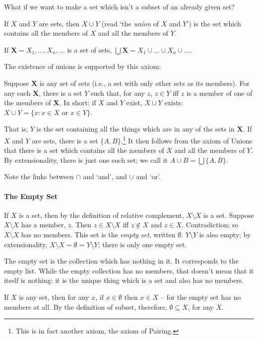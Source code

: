 What if we want to make a set which isn't a subset of an already given set?
\begin{definition}[Union] If $X$ and $Y$ are sets, then $X \cup Y$
    (read `the \emph{union} of $X$ and $Y$') is the set which contains all the members of $X$ and all the members of $Y$. 

If $\mathbf{X}=X_{1},\ldots,X_{n},\ldots$ is a set of sets, $\bigcup \mathbf{X} = X_{1} \cup \ldots \cup X_{n} \cup \ldots$.
\end{definition}
The existence of unions is supported by this axiom: \begin{axiom}[Unions]
  Suppose $\mathbf{X}$ is any set of sets (i.e., a set with only other sets as its members). For any such $\mathbf{X}$, there is a set $Y$ such that, for any $z$, $z\in Y$ iff $z$ is a member of one of the members of $\mathbf{X}$.  In short: if $X$ and $Y$ exist, $X\cup Y$ exists: $X \cup Y = \{x:x\in X \text{ or } x \in Y\}$.  
\end{axiom} That is, $Y$ is the set containing all the things which are in any of the sets in $\mathbf{X}$. If $X$ and $Y$ are sets, there is a set $\{A,B\}$.\footnote{This is in fact another axiom, the axiom of Pairing.} It then follows from the axiom of Unions that there is a set which contains all the members of $X$ and all the members of $Y$. By extensionality, there is just one such set; we call it $A \cup B = \bigcup\{A,B\}$.

Note the links  between $\cap$ and `and', and $\cup$ and `or'.

\paragraph{The Empty Set}

If $X$ is a set, then by the definition of relative complement, $X\setminus X$ is a set. Suppose $X\setminus X$ has a member, $z$.  Then 	$z\in X\setminus X$ iff $z \notin X \text{ and } z \in X$. Contradiction; so $X\setminus X$ has no members. This set is the \emph{empty set}, written $\emptyset$. $Y\setminus Y$ is also empty; by extensionality, $X\setminus X=\emptyset=Y\setminus Y$; there is only one empty set.

The empty set is the collection which has nothing in it. It corresponds to the empty list. While the empty collection has no members, that doesn't mean that it itself is nothing: it is the unique thing which is a set and also has no members. 

 If $X$ is any set, then for any $x$, if $x \in \emptyset$ then $x\in X$ – for the empty set has no members at all. By the definition of subset, therefore, $\emptyset \subseteq X$, for any $X$.

